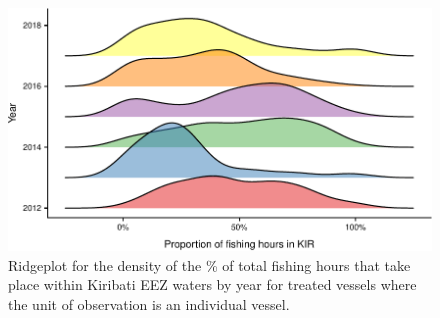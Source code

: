 \documentclass[9p,twocolumn,twoside,lineno]{pnas-new}
\begin{document}
\clearpage

\begin{figure}
\centering
	\includegraphics{img/hist_kir_fishing.pdf}
	\caption{\label{fig:hist_kir_fishing}Ridgeplot for the density of the \% of total fishing hours that take place within Kiribati EEZ waters by year for treated vessels where the unit of observation is an individual vessel.}
\end{figure}

\clearpage
\end{document}
